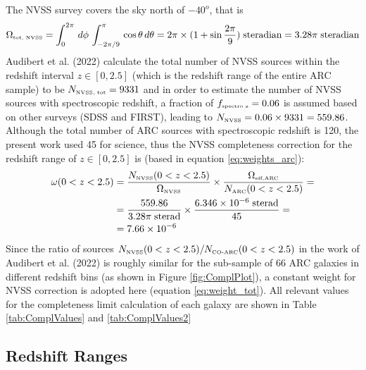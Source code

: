 The NVSS survey\cite{NVSS} covers the sky north of $-40^o$, that is 
\begin{equation*}
    \Omega_{\mbox{\tiny{tot, NVSS}}} = \int_{0}^{2\pi}\,d\phi\, \int_{-2\pi/9}^{\pi}\, \cos \theta\,d\theta = 2\pi \times (1+\sin\frac{2\pi}{9}) \; \mbox{steradian}= 3.28 \pi\; \mbox{steradian}
\end{equation*}
Audibert et al. (2022)\cite{Audibert2022} calculate the total number of NVSS sources within the redshift interval $z\in[0,2.5]$ (which is the redshift range of the entire ARC sample) to be $N_{\mbox{\tiny{NVSS, tot}}} =  9331$ and in order to estimate the number of NVSS sources with spectroscopic redshift, a fraction of $f_{\mbox{\tiny{spectro z}}} = 0.06$ is assumed based on other surveys (SDSS and FIRST), leading to $N_{\mbox{\tiny{NVSS}}} = 0.06\times 9331 = 559.86$.\\
Although the total number of ARC sources with spectroscopic redshift is 120, the present work used 45 for science, thus the NVSS completeness correction for the redshift range of $z\in[0,2.5]$ is (based in equation \ref{eq:weights_arc}):
\begin{equation}\begin{aligned}
    \omega(0< z<2.5) &= \dfrac{N_{\mbox{\tiny{NVSS}}}(0< z<2.5)}{\Omega_{\mbox{\tiny{NVSS}}}} \times  \dfrac{\Omega_{\mbox{\tiny{eff,ARC}}}}{N_{\mbox{\tiny{ARC}}}(0< z<2.5)}  =  \\ 
    & = \dfrac{559.86}{3.28 \pi \;\mbox{sterad}} \times  \dfrac{6.346\times10^{-6} \;\mbox{sterad}}{45} = \\ & = 7.66\times10^{-6}
    \end{aligned} 
\label{eq:weight_tot}
\end{equation}
Since the ratio of sources $N_{\mbox{\tiny{NVSS}}}(0< z<2.5)/N_{\mbox{\tiny{CO-ARC}}}(0< z<2.5)$ in the work of Audibert et al. (2022)\cite{Audibert2022} is roughly similar for the sub-sample of 66 ARC galaxies in different redshift bins (as shown in Figure \ref{fig:ComplPlot}), a constant weight for NVSS correction is adopted here (equation \ref{eq:weight_tot}). All relevant values for the completeness limit calculation of each galaxy are shown in Table \ref{tab:ComplValues} and \ref{tab:ComplValues2}

\subsection{Redshift Ranges} \label{subsec:Res/Redbins}

